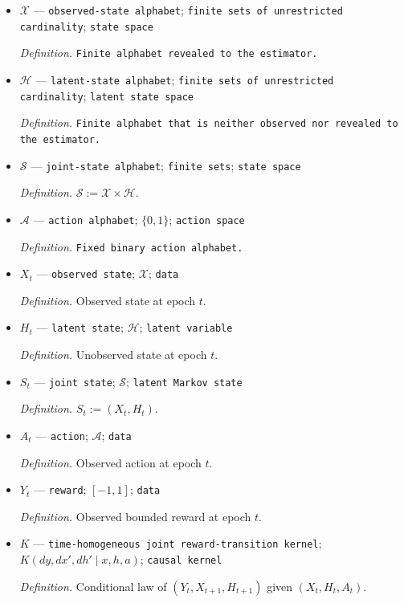 \documentclass{article}
\begin{document}
\begin{itemize}
  \item \(\mathcal X\) --- \texttt{observed-\allowbreak{}state alphabet}; \texttt{finite sets of unrestricted cardinality}; \texttt{state space}
  \par\smallskip\noindent\emph{Definition.} \texttt{Finite alphabet revealed to the estimator.}
  \item \(\mathcal H\) --- \texttt{latent-\allowbreak{}state alphabet}; \texttt{finite sets of unrestricted cardinality}; \texttt{latent state space}
  \par\smallskip\noindent\emph{Definition.} \texttt{Finite alphabet that is neither observed nor revealed to the estimator.}
  \item \(\mathcal S\) --- \texttt{joint-\allowbreak{}state alphabet}; \texttt{finite sets}; \texttt{state space}
  \par\smallskip\noindent\emph{Definition.} \(\mathcal S:=\mathcal X\times\mathcal H\).
  \item \(\mathcal A\) --- \texttt{action alphabet}; \(\{0,1\}\); \texttt{action space}
  \par\smallskip\noindent\emph{Definition.} \texttt{Fixed binary action alphabet.}
  \item \(X_t\) --- \texttt{observed state}; \(\mathcal X\); \texttt{data}
  \par\smallskip\noindent\emph{Definition.} Observed state at epoch \(t\).
  \item \(H_t\) --- \texttt{latent state}; \(\mathcal H\); \texttt{latent variable}
  \par\smallskip\noindent\emph{Definition.} Unobserved state at epoch \(t\).
  \item \(S_t\) --- \texttt{joint state}; \(\mathcal S\); \texttt{latent Markov state}
  \par\smallskip\noindent\emph{Definition.} \(S_t:=(X_t,H_t)\).
  \item \(A_t\) --- \texttt{action}; \(\mathcal A\); \texttt{data}
  \par\smallskip\noindent\emph{Definition.} Observed action at epoch \(t\).
  \item \(Y_t\) --- \texttt{reward}; \([-1,1]\); \texttt{data}
  \par\smallskip\noindent\emph{Definition.} Observed bounded reward at epoch \(t\).
  \item \(K\) --- \texttt{time-\allowbreak{}homogeneous joint reward-\allowbreak{}transition kernel}; \(K(dy,dx',dh'\mid x,h,a)\); \texttt{causal kernel}
  \par\smallskip\noindent\emph{Definition.} Conditional law of \((Y_t,X_{t+1},H_{t+1})\) given \((X_t,H_t,A_t)\).

\end{itemize}
\end{document}
